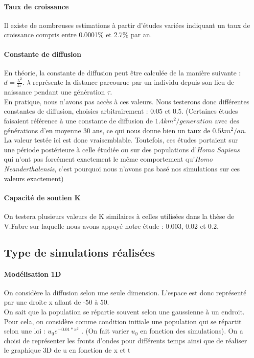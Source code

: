\documentclass[a4paper,11pt]{article}
\begin{document}
\paragraph{Taux de croissance} Il existe de nombreuses estimations à partir d'études variées indiquant un taux de croissance compris entre 0.0001\% et 2.7\% par an.
\paragraph{Constante de diffusion} En théorie, la constante de diffusion peut être calculée de la manière suivante : $d= \frac{\lambda ^2}{4\tau}$. $\lambda $ représente la distance parcourue par un individu depuis son lieu de naissance pendant une génération $\tau$.\\ 
En pratique, nous n'avons pas accès à ces valeurs. Nous testerons donc différentes constantes de diffusion, choisies arbitrairement : 0.05 et 0.5. (Certaines études faisaient référence à une constante de diffusion de $1.4km^2/generation$ avec des générations d'en moyenne 30 ans, ce qui nous donne bien un taux de $0.5 km^2/an$. La valeur testée ici est donc vraisemblable. Toutefois, ces études portaient sur une période postérieure à celle étudiée ou sur des populations d'\textit{Homo Sapiens} qui n'ont pas forcément exactement le même comportement qu'\textit{Homo Neanderthalensis}, c'est pourquoi nous n'avons pas basé nos simulations sur ces valeurs exactement)
\paragraph{Capacité de soutien K} On testera plusieurs valeurs de K similaires à celles utilisées dans la thèse de V.Fabre sur laquelle nous avons appuyé notre étude : 0.003, 0.02 et 0.2. %
\subsection{Type de simulations réalisées}
\paragraph{Modélisation 1D}
On considère la diffusion selon une seule dimension. L'espace est donc représenté par une droite x allant de -50 à 50.\\
On sait que la population se répartie souvent selon une gaussienne à un endroit. Pour cela, on considère comme condition initiale une population qui se répartit selon une loi :  $u_0 e^{-0.01*x^2}$ . (On fait varier $u_0$ en fonction des simulations).
On a choisi  de représenter les fronts d'ondes pour différents temps ainsi que de réaliser le graphique 3D de u en fonction de x et t
\end{document}

